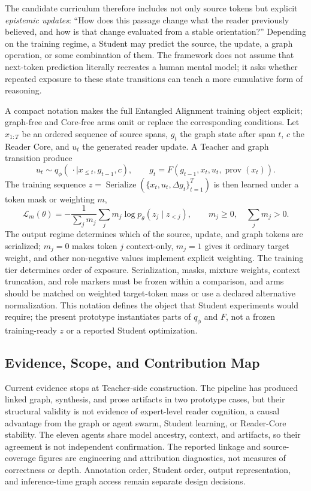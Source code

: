 \documentclass[11pt]{article}
\begin{document}
The candidate curriculum therefore includes not only source tokens but explicit \textit{epistemic updates}: ``How does this passage change what the reader previously believed, and how is that change evaluated from a stable orientation?'' Depending on the training regime, a Student may predict the source, the update, a graph operation, or some combination of them. The framework does not assume that next-token prediction literally recreates a human mental model; it asks whether repeated exposure to these state transitions can teach a more cumulative form of reasoning.

\begin{samepage}
A compact notation makes the full Entangled Alignment training object explicit;
graph-free and Core-free arms omit or replace the corresponding conditions. Let
$x_{1:T}$ be an ordered sequence of source spans, $g_t$ the graph state after
span $t$, $c$ the Reader Core, and $u_t$ the generated reader update. A Teacher
and graph transition produce
\[
u_t \sim q_\phi(\,\cdot\mid x_{\leq t},g_{t-1},c), \qquad
g_t=F\!\left(g_{t-1},x_t,u_t,\operatorname{prov}(x_t)\right).
\]
The training sequence $z=\operatorname{Serialize}(\{x_t,u_t,\Delta
g_t\}_{t=1}^T)$ is then learned under a token mask or weighting $m$,
\[
\mathcal{L}_m(\theta)
=-\frac{1}{\sum_j m_j}\sum_j m_j\log p_\theta(z_j\mid z_{<j}),
\qquad m_j\geq 0,\quad \sum_j m_j>0.
\]
The output regime determines which of the source, update, and graph tokens are
serialized; $m_j=0$ makes token $j$ context-only, $m_j=1$ gives it ordinary
target weight, and other non-negative values implement explicit weighting. The
training tier determines order of exposure. Serialization, masks, mixture
weights, context truncation, and role markers must be frozen within a
comparison, and arms should be matched on weighted target-token mass or use a
declared alternative normalization. This notation defines the object that
Student experiments would require; the present prototype instantiates parts of
$q_\phi$ and $F$, not a frozen training-ready $z$ or a reported Student
optimization.
\end{samepage}

\subsection{Evidence, Scope, and Contribution Map}\label{sec:contributions}

Current evidence stops at Teacher-side construction. The pipeline has produced
linked graph, synthesis, and prose artifacts in two prototype cases, but their
structural validity is not evidence of expert-level reader cognition, a causal
advantage from the graph or agent swarm, Student learning, or Reader-Core
stability. The eleven agents share model ancestry, context, and artifacts, so
their agreement is not independent confirmation. The reported linkage and
source-coverage figures are engineering and attribution diagnostics, not
measures of correctness or depth. Annotation order, Student order, output
representation, and inference-time graph access remain separate design
decisions.
\end{document}
